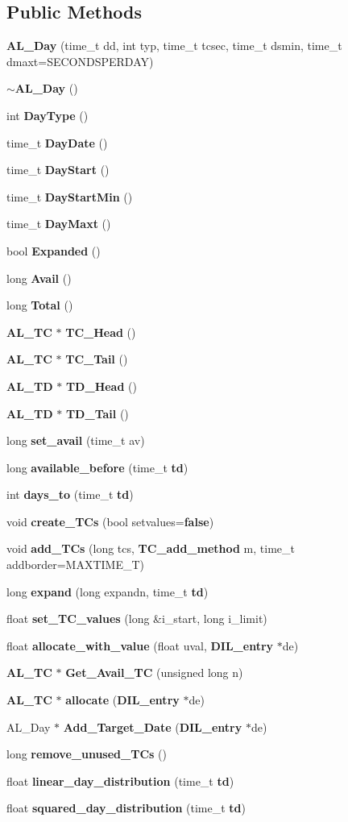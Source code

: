 \subsection*{Public Methods}
\begin{CompactItemize}
\item 
{\bf AL\_\-Day} (time\_\-t dd, int typ, time\_\-t tcsec, time\_\-t dsmin, time\_\-t dmaxt=SECONDSPERDAY)
\item 
{\bf $\sim$AL\_\-Day} ()
\item 
int {\bf Day\-Type} ()
\item 
time\_\-t {\bf Day\-Date} ()
\item 
time\_\-t {\bf Day\-Start} ()
\item 
time\_\-t {\bf Day\-Start\-Min} ()
\item 
time\_\-t {\bf Day\-Maxt} ()
\item 
bool {\bf Expanded} ()
\item 
long {\bf Avail} ()
\item 
long {\bf Total} ()
\item 
{\bf AL\_\-TC} $\ast$ {\bf TC\_\-Head} ()
\item 
{\bf AL\_\-TC} $\ast$ {\bf TC\_\-Tail} ()
\item 
{\bf AL\_\-TD} $\ast$ {\bf TD\_\-Head} ()
\item 
{\bf AL\_\-TD} $\ast$ {\bf TD\_\-Tail} ()
\item 
long {\bf set\_\-avail} (time\_\-t av)
\item 
long {\bf available\_\-before} (time\_\-t {\bf td})
\item 
int {\bf days\_\-to} (time\_\-t {\bf td})
\item 
void {\bf create\_\-TCs} (bool setvalues={\bf false})
\item 
void {\bf add\_\-TCs} (long tcs, {\bf TC\_\-add\_\-method} m, time\_\-t addborder=MAXTIME\_\-T)
\item 
long {\bf expand} (long expandn, time\_\-t {\bf td})
\item 
float {\bf set\_\-TC\_\-values} (long \&i\_\-start, long i\_\-limit)
\item 
float {\bf allocate\_\-with\_\-value} (float uval, {\bf DIL\_\-entry} $\ast$de)
\item 
{\bf AL\_\-TC} $\ast$ {\bf Get\_\-Avail\_\-TC} (unsigned long n)
\item 
{\bf AL\_\-TC} $\ast$ {\bf allocate} ({\bf DIL\_\-entry} $\ast$de)
\item 
AL\_\-Day $\ast$ {\bf Add\_\-Target\_\-Date} ({\bf DIL\_\-entry} $\ast$de)
\item 
long {\bf remove\_\-unused\_\-TCs} ()
\item 
float {\bf linear\_\-day\_\-distribution} (time\_\-t {\bf td})
\item 
float {\bf squared\_\-day\_\-distribution} (time\_\-t {\bf td})
\end{CompactItemize}
